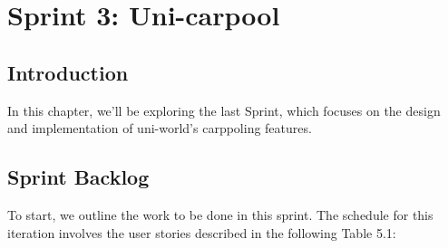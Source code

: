 \chapter{Sprint 3: Uni-carpool}



\section*{Introduction}


In this chapter, we'll be exploring the last Sprint, which focuses on the design and implementation of uni-world's carppoling features.

\section{Sprint Backlog}
To start, we outline the work to be done in this sprint. The schedule for this iteration
involves the user stories described in the following Table 5.1:

